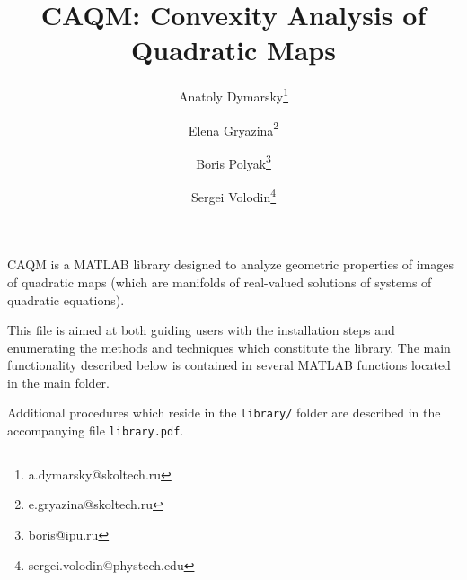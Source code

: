 \documentclass[a4paper]{article}
\title{CAQM: Convexity Analysis of Quadratic Maps}
\date{}
\author[1]{Anatoly Dymarsky\thanks{a.dymarsky@skoltech.ru}}
\author[1]{Elena Gryazina\thanks{e.gryazina@skoltech.ru}}
\author[2]{Boris Polyak\thanks{boris@ipu.ru}}
\author[1]{Sergei Volodin\thanks{sergei.volodin@phystech.edu}}
\affil[1]{Skolkovo Institute of Science and Technology}
\affil[2]{Institute for Control Sciences RAS}
\theoremstyle{definition}
\begin{document}
\maketitle
CAQM is a MATLAB library designed to analyze geometric properties of images of quadratic maps (which are manifolds of real-valued solutions of systems of quadratic equations).

This file is aimed at both guiding users with the installation steps and enumerating the methods and techniques which constitute the library. The main functionality described below is contained in several MATLAB functions located in the main folder.

Additional procedures which reside in the {\tt library/} folder are described in the accompanying file {\tt library.pdf}.

\newpage
{}
\end{document}
